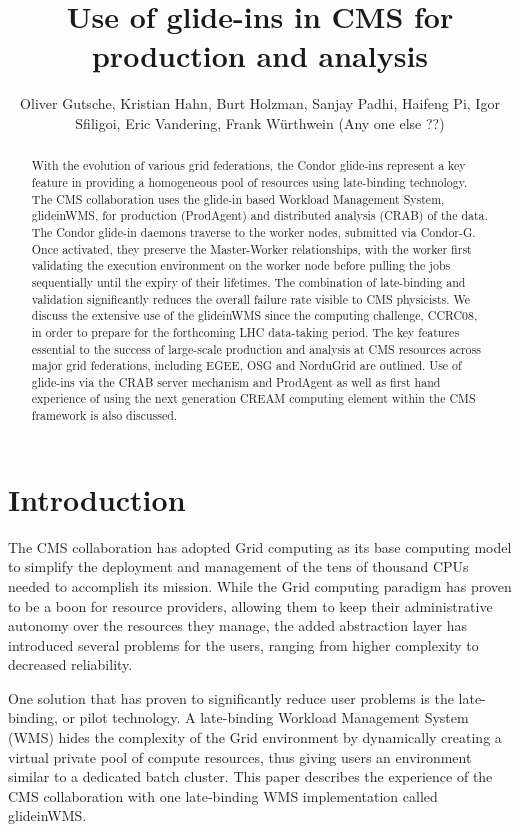 \documentclass[a4paper]{jpconf}
\begin{document}
\title{Use of glide-ins in CMS for production and analysis \jpcs}

\author{Oliver Gutsche, Kristian Hahn, Burt Holzman, Sanjay Padhi, Haifeng Pi, Igor Sfiligoi, Eric Vandering, Frank W\"urthwein (Any one else ??)}

\address{FNAL, MIT, UCSD team}


\begin{abstract}
With the evolution of various grid federations, the Condor glide-ins represent a key feature in providing a homogeneous pool of resources using late-binding technology. The CMS collaboration uses the glide-in based Workload Management System, glideinWMS, for production (ProdAgent) and distributed analysis (CRAB) of the data. The Condor glide-in daemons traverse to the worker nodes, submitted via Condor-G. Once activated, they preserve the Master-Worker relationships, with the worker first validating the execution environment on the worker node before pulling the jobs sequentially until the expiry of their lifetimes. The combination of late-binding and validation significantly reduces the overall failure rate visible to CMS physicists. We discuss the extensive use of the glideinWMS since the computing challenge, CCRC08, in order to prepare for the forthcoming LHC data-taking period. The key features essential to the success of large-scale production and analysis at CMS resources across major grid federations, including EGEE, OSG and NorduGrid are outlined. Use of glide-ins via the CRAB server mechanism and ProdAgent as well as first hand experience of using the next generation CREAM computing element within the CMS framework is also discussed.
\end{abstract}

\section{Introduction}

The CMS collaboration has adopted Grid computing as its base computing model to simplify the deployment and management of the
tens of thousand CPUs needed to accomplish its mission.
While the Grid computing paradigm has proven to be a boon for resource providers, 
allowing them to keep their administrative autonomy over the resources they manage,
the added abstraction layer has introduced several problems for the users, 
ranging from higher complexity to decreased reliability.

One solution that has proven to significantly reduce user problems is the late-binding, or pilot technology.  
A late-binding Workload Management System (WMS) hides the complexity of the Grid environment by dynamically creating 
a virtual private pool of compute resources, thus giving users an environment similar to a dedicated batch cluster.
This paper describes the experience of the CMS collaboration with one late-binding WMS implementation called glideinWMS. 
\end{document}
